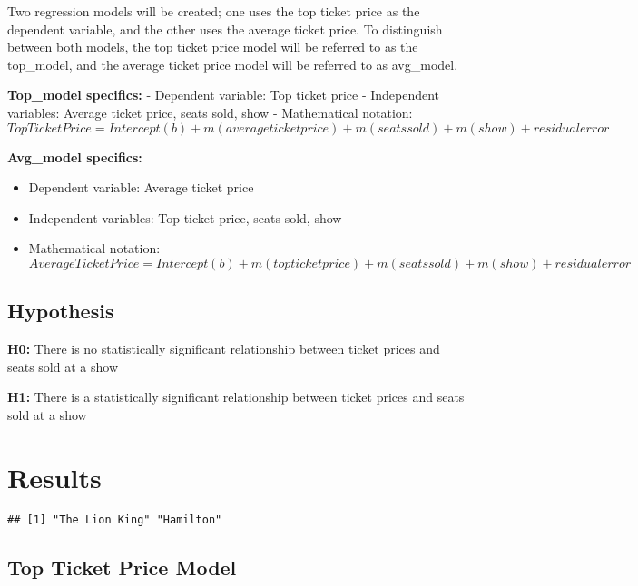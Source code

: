 \documentclass[
]{article}
\providecommand{\tightlist}{%
  \setlength{\itemsep}{0pt}\setlength{\parskip}{0pt}}
\begin{document}
Two regression models will be created; one uses the top ticket price as the dependent variable, and the other uses the average ticket price. To distinguish between both models, the top ticket price model will be referred to as the top\_model, and the average ticket price model will be referred to as avg\_model.

\textbf{Top\_model specifics:}
- Dependent variable: Top ticket price
- Independent variables: Average ticket price, seats sold, show
- Mathematical notation:
\[
Top Ticket Price = Intercept (b) + m (average ticket price) + m (seats sold) + m (show) + residual error
\]

\textbf{Avg\_model specifics:}

\begin{itemize}
\tightlist
\item
  Dependent variable: Average ticket price
\item
  Independent variables: Top ticket price, seats sold, show
\item
  Mathematical notation:
  \[
  Average Ticket Price = Intercept (b) + m (top ticket price) + m (seats sold) + m (show) + residual error
  \]
\end{itemize}

\hypertarget{hypothesis}{%
\subsection{Hypothesis}\label{hypothesis}}

\textbf{H0:} There is no statistically significant relationship between ticket prices and seats sold at a show

\textbf{H1:} There is a statistically significant relationship between ticket prices and seats sold at a show

\hypertarget{results}{%
\section{Results}\label{results}}

\begin{verbatim}
## [1] "The Lion King" "Hamilton"
\end{verbatim}

\hypertarget{top-ticket-price-model}{%
\subsection{Top Ticket Price Model}\label{top-ticket-price-model}}
\end{document}
